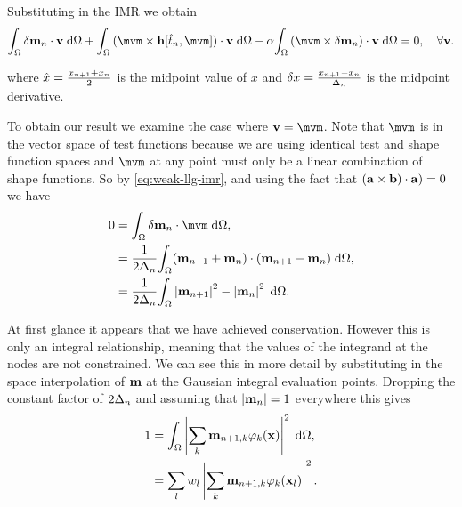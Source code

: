 
Substituting in the IMR we obtain
\begin{equation}
  \label{eq:weak-llg-imr}
  \ipg{\dmdtm}{\testv} + \ipg{(\mvm \times \hv[\tm, \mvm])}{\testv} - \dampc \ipg{(\mvm \times \dmdtm)}{\testv} = 0, \quad \forall \testv .
\end{equation}

where $\hat{x} = \frac{x_{n+1} + x_{n}}{2}$ is the midpoint value of $x$ and $\delta x = \frac{x_{n+1} - x_n}{\Delta_{n}}$ is the midpoint derivative.

To obtain our result we examine the case where $\testv = \mvm$.
Note that $\mvm$ is in the vector space of test functions because we are using identical test and shape function spaces and $\mvm$ at any point must only be a linear combination of shape functions.
So by \eqref{eq:weak-llg-imr}, and using the fact that $({\mathbf{a}} \times {\mathbf{b}}) \cdot {\mathbf{a}}) = 0$ we have
\begin{equation}
\label{eq:23}
  \begin{aligned}
    0 &= \ipg{\dmdtm}{\mvm}, \\
    &= \frac{1}{2\dtn} \intd{(\mv_{n+1} + \mv_{n}) \cdot (\mv_{n+1} - \mv_n)}, \\
    &= \frac{1}{2\dtn} \intd{\abs{\mv_{n+1}}^2 - \abs{\mv_{n}}^2}.
  \end{aligned}
\end{equation}

At first glance it appears that we have achieved conservation. However this is only an integral relationship, meaning that the values of the integrand at the nodes are not constrained.
We can see this in more detail by substituting in the space interpolation of $\mathbf{m}$ at the Gaussian integral evaluation points.
Dropping the constant factor of $2\Delta_{n}$ and assuming that $\left|{\mathbf{m}_n} \right| = 1$ everywhere this gives
\begin{equation}
  \begin{aligned} 
    1 &= {\int_{\Omega} \left|{\sum_k \mathbf{m}_{n+1, k} \varphi_k(\mathbf{x})} \right|^2 {\; \text{d}} {\Omega}}, \\
    &= \sum_l w_l \left|{\sum_k \mathbf{m}_{n+1, k} \varphi_k(\mathbf{x}_l)} \right|^2.
  \end{aligned} 
\end{equation}

